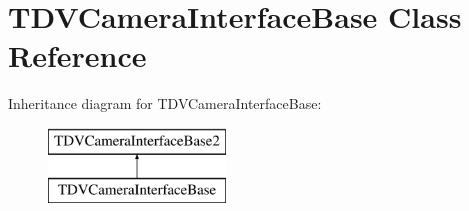 \hypertarget{classTDVCameraInterfaceBase}{
\section{TDVCameraInterfaceBase Class Reference}
\label{classTDVCameraInterfaceBase}
}
Inheritance diagram for TDVCameraInterfaceBase:\begin{figure}[H]
\begin{center}
\leavevmode
\includegraphics[height=2.000000cm]{classTDVCameraInterfaceBase}
\end{center}
\end{figure}
